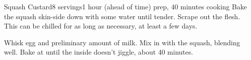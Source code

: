 \documentclass[../Cookbook.tex]{subfiles}
\begin{document}
\begin{recipe}[SquashCustard]{Squash Custard}{8 servings}{1 hour (ahead of time) prep, 40 minutes cooking}
	Bake the squash skin-side down with some water until tender.
	Scrape out the flesh. This can be chilled for as long as necessary, at least a few days.

	Whisk egg and preliminary amount of milk.
	Mix in with the squash, blending well.
	Bake at  until the inside doesn't jiggle, about 40 %
	minutes.
\end{recipe}
\end{document}
